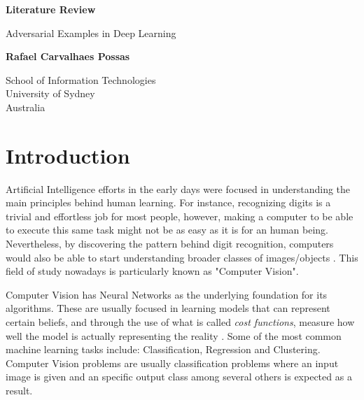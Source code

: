 \documentclass{article}
\begin{document}
\begin{titlepage}
    \begin{center}
        \vspace*{1cm}
        \huge
        \textbf{Literature Review}
        
        \vspace{0.5cm}
        \LARGE
        Adversarial Examples in Deep Learning

        
        \vspace{1.5cm}
        
        \textbf{Rafael Carvalhaes Possas}
        
        \vfill
        
        \vspace{0.8cm}
        
        
        School of Information Technologies\\
        University of Sydney\\
        Australia\\

        
    \end{center}
\end{titlepage}
\section{Introduction}\label{sec:intro}

Artificial Intelligence efforts in the early days were focused in understanding the main principles behind human learning. For instance, recognizing digits is a trivial and effortless job for most people, however, making a computer to be able to execute this same task might not be as easy as it is for an human being. Nevertheless, by discovering the pattern behind digit recognition, computers would also be able to start understanding broader classes of images/objects \cite{krizhevsky2012}. This field of study nowadays is particularly known as "Computer Vision".

Computer Vision has Neural Networks as the underlying foundation for its algorithms. These are usually  focused in learning models that can represent certain beliefs, and through the use of what is called \textit{cost functions}, measure how well the model is actually representing the reality \cite{goodfellow2016_book}. Some of the most common machine learning tasks include: Classification, Regression and Clustering. Computer Vision problems are usually classification problems where an input image is given and an specific output class among several others is expected as a result. 
\end{document}
